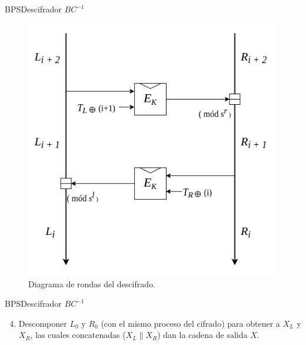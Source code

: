 \begin{frame}{BPS}{Descifrador $BC^{-1}$}

  \begin{figure}[H]
    \begin{center}
      \includegraphics[width=0.6\linewidth]
        {../../../diagramas_comunes/bps/descifrado_bc}
      \caption{Diagrama de rondas del descifrado.}
     \end{center}
  \end{figure}

\end{frame}

\begin{frame}{BPS}{Descifrador $BC^{-1}$}

  \begin{enumerate}
    \setcounter{enumi}{3}
    \item Descomponer $L_0$ y $R_0$ (con el mismo proceso del cifrado) para
      obtener a $X_L$ y $X_R$, las cuales concatenadas ($X_L \parallel X_R$)
      dan la cadena de salida $X$.
  \end{enumerate}

\end{frame}

